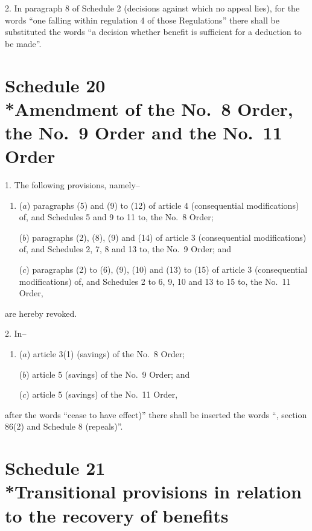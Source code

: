 \documentclass[12pt,a4paper]{article}
\begin{document}
\medskip

2.  In paragraph 8 of Schedule 2 (decisions against which no appeal lies), for the words “one falling within regulation 4 of those Regulations” there shall be substituted the words “a decision whether benefit is sufficient for a deduction to be made”.

\part[Schedule 20 --- Amendment of the No.\ 8 Order, the No.\ 9 Order and the No.\ 11 Order]{Schedule 20\\*Amendment of the No.\ 8 Order, the No.\ 9 Order and the No.\ 11 Order}

\renewcommand\parthead{--- Schedule 20}

1.  The following provisions, namely–
\begin{enumerate}\item[]
($a$) paragraphs (5) and (9) to (12) of article 4 (consequential modifications) of, and Schedules 5 and 9 to 11 to, the No.\ 8 Order;

($b$) paragraphs (2), (8), (9) and (14) of article 3 (consequential modifications) of, and Schedules 2, 7, 8 and 13 to, the No.\ 9 Order; and

($c$) paragraphs (2) to (6), (9), (10) and (13) to (15) of article 3 (consequential modifications) of, and Schedules 2 to 6, 9, 10 and 13 to 15 to, the No.\ 11 Order, 
\end{enumerate}
are hereby revoked.

\medskip

2.  In–
\begin{enumerate}\item[]
($a$) article 3(1) (savings) of the No.\ 8 Order;

($b$) article 5 (savings) of the No.\ 9 Order; and

($c$) article 5 (savings) of the No.\ 11 Order,
\end{enumerate}
after the words “cease to have effect)” there shall be inserted the words “, section 86(2) and Schedule 8 (repeals)”.

\part[Schedule 21 --- Transitional provisions in relation to the recovery of benefits]{Schedule 21\\*Transitional provisions in relation to the recovery of benefits}
\end{document}
